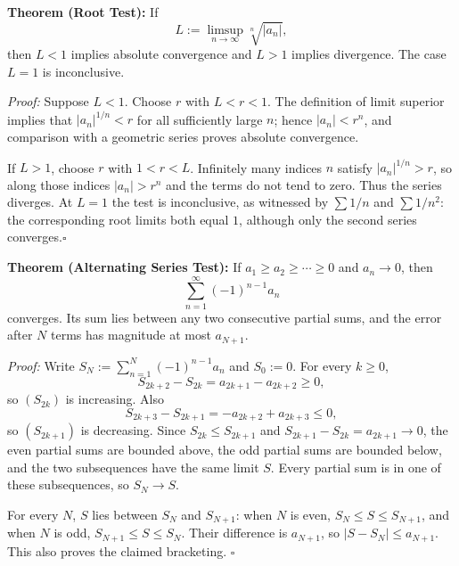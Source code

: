\documentclass[a4paper,11pt,abstracton]{scrartcl}
\theoremstyle{dotlessP}
\theoremstyle{dotlessS}
\theoremstyle{remark}
\theoremstyle{definition}
\begin{document}
\begin{problem_box}
\textbf{Theorem (Root Test):} If
\[
 L:=\limsup_{n\to\infty}\sqrt[n]{|a_n|},
\]
then $L<1$ implies absolute convergence and $L>1$ implies
divergence. The case $L=1$ is inconclusive.
\end{problem_box}

\begin{claim_box}
\textit{Proof:} Suppose $L<1$. Choose $r$ with $L<r<1$. The
definition of limit superior implies that $|a_n|^{1/n}<r$ for all
sufficiently large $n$; hence $|a_n|<r^n$, and comparison with a
geometric series proves absolute convergence.

If $L>1$, choose $r$ with $1<r<L$. Infinitely many indices $n$
satisfy $|a_n|^{1/n}>r$, so along those indices $|a_n|>r^n$ and the
terms do not tend to zero. Thus the series diverges. At $L=1$ the
test is inconclusive, as witnessed by $\sum1/n$ and $\sum1/n^2$:
the corresponding root limits both equal $1$, although only the
second series converges.\hfill$\square$
\end{claim_box}

\begin{problem_box}
\textbf{Theorem (Alternating Series Test):} If
$a_1\ge a_2\ge\cdots\ge0$ and $a_n\to0$, then
\[
 \sum_{n=1}^{\infty}(-1)^{n-1}a_n
\]
converges. Its sum lies between any two consecutive partial sums,
and the error after $N$ terms has magnitude at most $a_{N+1}$.
\end{problem_box}

\begin{claim_box}
\textit{Proof:} Write
$S_N:=\sum_{n=1}^N(-1)^{n-1}a_n$ and $S_0:=0$. For every $k\ge0$,
\[
    S_{2k+2}-S_{2k}=a_{2k+1}-a_{2k+2}\ge0,
\]
so $(S_{2k})$ is increasing. Also
\[
    S_{2k+3}-S_{2k+1}=-a_{2k+2}+a_{2k+3}\le0,
\]
so $(S_{2k+1})$ is decreasing. Since
$S_{2k}\le S_{2k+1}$ and $S_{2k+1}-S_{2k}=a_{2k+1}\to0$,
the even partial sums are bounded above, the odd partial sums are
bounded below, and the two subsequences have the same limit $S$.
Every partial sum is in one of these subsequences, so $S_N\to S$.

For every $N$, $S$ lies between $S_N$ and $S_{N+1}$: when $N$ is
even, $S_N\le S\le S_{N+1}$, and when $N$ is odd,
$S_{N+1}\le S\le S_N$. Their difference is $a_{N+1}$, so
$|S-S_N|\le a_{N+1}$. This also proves the claimed bracketing.
\hfill$\square$
\end{claim_box}
\end{document}
